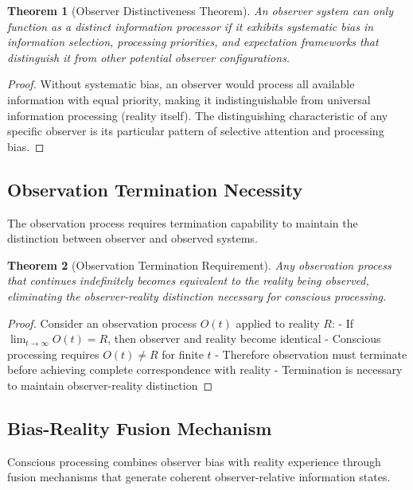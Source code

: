 \documentclass[12pt,a4paper]{article}
\newtheorem{theorem}{Theorem}[section]
\begin{document}
\begin{theorem}[Observer Distinctiveness Theorem]
An observer system can only function as a distinct information processor if it exhibits systematic bias in information selection, processing priorities, and expectation frameworks that distinguish it from other potential observer configurations.
\end{theorem}

\begin{proof}
Without systematic bias, an observer would process all available information with equal priority, making it indistinguishable from universal information processing (reality itself). The distinguishing characteristic of any specific observer is its particular pattern of selective attention and processing bias.
\end{proof}

\subsection{Observation Termination Necessity}

The observation process requires termination capability to maintain the distinction between observer and observed systems.

\begin{theorem}[Observation Termination Requirement]
Any observation process that continues indefinitely becomes equivalent to the reality being observed, eliminating the observer-reality distinction necessary for conscious processing.
\end{theorem}

\begin{proof}
Consider an observation process $O(t)$ applied to reality $R$:
- If $\lim_{t \to \infty} O(t) = R$, then observer and reality become identical
- Conscious processing requires $O(t) \neq R$ for finite $t$
- Therefore observation must terminate before achieving complete correspondence with reality
- Termination is necessary to maintain observer-reality distinction
\end{proof}

\subsection{Bias-Reality Fusion Mechanism}

Conscious processing combines observer bias with reality experience through fusion mechanisms that generate coherent observer-relative information states.
\end{document}
